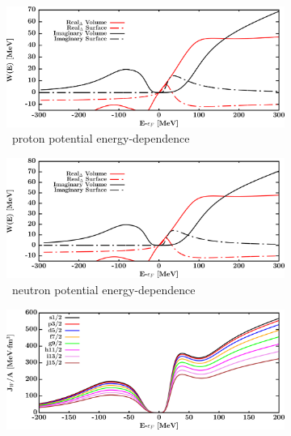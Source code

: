 \begin{figure}[hbtp]
\begin{subfigure}[b]{0.45\textwidth}
        \centering
        \includegraphics[width=\linewidth]{figures/ca40_protonPotentials.png}
        \caption{\caForty\ proton potential energy-dependence}
        \label{DOMFitData_ca40_proton_potentialComponent_energy}
    \end{subfigure}\hspace{6pt}
    \begin{subfigure}[b]{0.45\linewidth}
        \centering
        \includegraphics[width=\linewidth]{figures/ca40_neutronPotentials.png}
        \caption{\caForty\ neutron potential energy-dependence}
        \label{DOMFitData_ca40_neutron_potentialComponent_energy}
    \end{subfigure}\vspace{0.3in}
    \begin{subfigure}[b]{0.45\textwidth}
        \centering
        \includegraphics[width=\linewidth]{figures/ca40_protonVolumeIntegrals.png}

\end{subfigure}
\end{figure}

